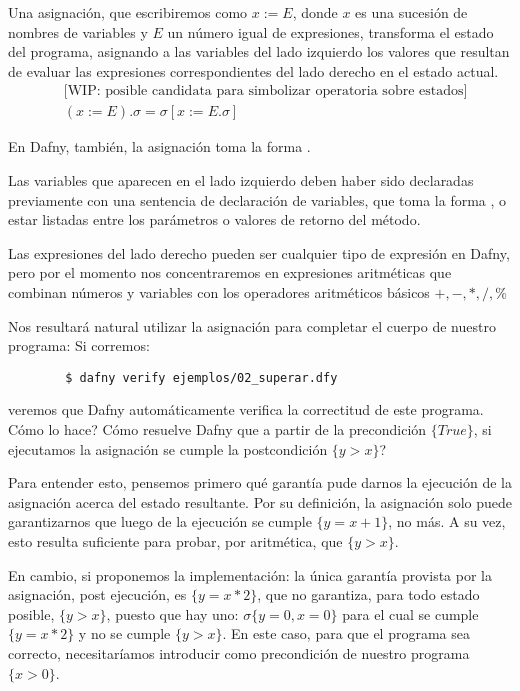 \documentclass[12pt, a4paper, openany, fleqn]{book}
\begin{document}
    Una asignación, que escribiremos como $x:=E$, donde $x$ es una sucesión de nombres de variables y $E$ un número igual de expresiones, transforma el estado del programa, asignando a las variables del lado izquierdo los valores que resultan de evaluar las expresiones correspondientes del lado derecho en el estado actual.
    \begin{align*}
        & \text{[WIP: posible candidata para simbolizar operatoria sobre estados]} \\
        & (x := E).\sigma = \sigma[x:=E.\sigma]
    \end{align*}

    En Dafny, también, la asignación toma la forma .

    Las variables que aparecen en el lado izquierdo deben haber sido declaradas previamente con una sentencia de declaración de variables, que toma la forma , o estar listadas entre los parámetros o valores de retorno del método.

    Las expresiones del lado derecho pueden ser cualquier tipo de expresión en Dafny, pero por el momento nos concentraremos en expresiones aritméticas que combinan números y variables con los operadores aritméticos básicos $+,-,*,/,\%$

    Nos resultará natural utilizar la asignación para completar el cuerpo de nuestro programa:
    Si corremos:
    \begin{verbatim}
        $ dafny verify ejemplos/02_superar.dfy
    \end{verbatim}
    veremos que Dafny automáticamente verifica la correctitud de este programa. Cómo lo hace? Cómo resuelve Dafny que a partir de la precondición $\{True\}$, si ejecutamos la asignación  se cumple la postcondición $\{ y > x \}$?

    Para entender esto, pensemos primero qué garantía pude darnos la ejecución de la asignación acerca del estado resultante. Por su definición, la asignación solo puede garantizarnos que luego de la ejecución se cumple $\{ y = x + 1 \}$, no más. A su vez, esto resulta suficiente para probar, por aritmética, que $\{ y > x \}$.

    En cambio, si proponemos la implementación:
    la única garantía provista por la asignación, post ejecución, es $\{ y = x * 2 \}$, que no garantiza, para todo estado posible, $\{ y > x \}$, puesto que hay uno: $\sigma\{y=0,x=0\}$ para el cual se cumple $\{ y = x * 2 \}$ y no se cumple $\{ y > x \}$. En este caso, para que el programa sea correcto, necesitaríamos introducir como precondición de nuestro programa $\{ x > 0 \}$.
\end{document}
